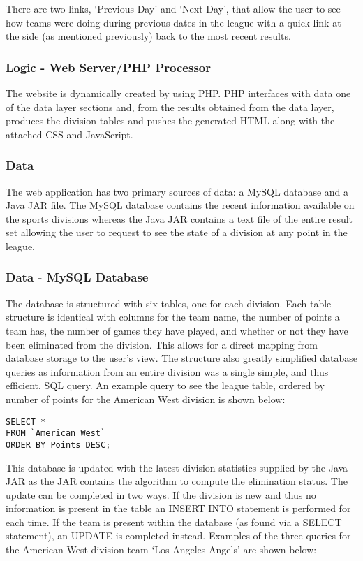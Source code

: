 There are two links, `Previous Day' and `Next Day', that allow the user to
see how teams were doing during previous dates in the league with a quick
link at the side (as mentioned previously) back to the most recent results.

\subsubsection{Logic - Web Server/PHP Processor}

The website is dynamically created by using PHP. PHP interfaces with data one
of the data layer sections and, from the results obtained from the data layer,
produces the division tables and pushes the generated HTML along with the
attached CSS and JavaScript.

\subsubsection{Data}

The web application has two primary sources of data: a MySQL database and a
Java JAR file. The MySQL database contains the recent information available
on the sports divisions whereas the Java JAR contains a text file of the entire
result set allowing the user to request to see the state of a division at any
point in the league.

\subsubsection{Data - MySQL Database}

The database is structured with six tables, one for each division. Each table
structure is identical with columns for the team name, the number of points
a team has, the number of games they have played, and whether or not they have
been eliminated from the division. This allows for a direct mapping from
database storage to the user's view. The structure also greatly simplified 
database queries as information from an entire division was a single simple, and 
thus efficient, SQL query. An example query to see the league table, ordered by 
number of points for the American West division is shown below:

\begin{verbatim}
SELECT *
FROM `American West`
ORDER BY Points DESC;
\end{verbatim}

This database is updated with the latest division statistics supplied by the 
Java JAR as the JAR contains the algorithm to compute the elimination status.
The update can be completed in two ways. If the division is new and thus no
information is present in the table an INSERT INTO statement is performed for
each time. If the team is present within the database (as found via a SELECT
statement), an UPDATE is completed instead. Examples of the three queries
for the American West division team `Los Angeles Angels' are shown below:

